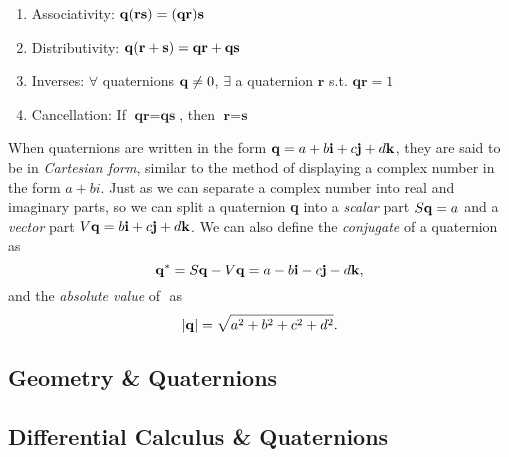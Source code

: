 \begin{thm}
\label{thm:mult}
\begin{enumerate} \textit{Properties of Quaternion Multiplication}
	\item Associativity: $\text{\textbf{q}} ( \textbf{r} \textbf{s}) = (\textbf{q} \textbf{r}) \textbf{s}$
	\item Distributivity: $\text{\textbf{q}} (\textbf{r} + \textbf{s}) = \textbf{q} \textbf{r} + \textbf{q} \textbf{s}$
	\item Inverses: $\forall$ quaternions $\text{\textbf{q}} \neq 0$, $\exists$ a quaternion $\textbf{r}$ s.t. $\textbf{qr} = 1$
	\item Cancellation: If $\textbf{qr}=\textbf{qs}$, then $\textbf{r} = \textbf{s}$
\end{enumerate}

\end{thm}

\noindent When quaternions are written in the form $\text{\textbf{q}} = a + b\text{\textbf{i}} + c\text{\textbf{j}} + d\text{\textbf{k}}$, they are said to be in \textit{Cartesian form}, similar to the method of displaying a complex number in the form $a + bi$.
Just as we can separate a complex number into real and imaginary parts, so we can split a quaternion \textbf{q} into a \textit{scalar} part $S\text{\textbf{q}} = a$ and a \textit{vector} part $V\text{\textbf{q}} = b\text{\textbf{i}} + c\text{\textbf{j}} + d\text{\textbf{k}}$.
We can also define the \textit{conjugate} of a quaternion as $$ \text{\textbf{q}}^* = S\text{\textbf{q}} - V\text{\textbf{q}} = a - b\text{\textbf{i}} - c\text{\textbf{j}} - d\text{\textbf{k}},$$ and the \textit{absolute value} of \qq$ $ as $$ \lvert\text{\textbf{q}}\rvert = \sqrt{a^2 + b^2 + c^2 + d^2}.$$


\subsection{Geometry \& Quaternions}

\subsection{Differential Calculus \& Quaternions}
